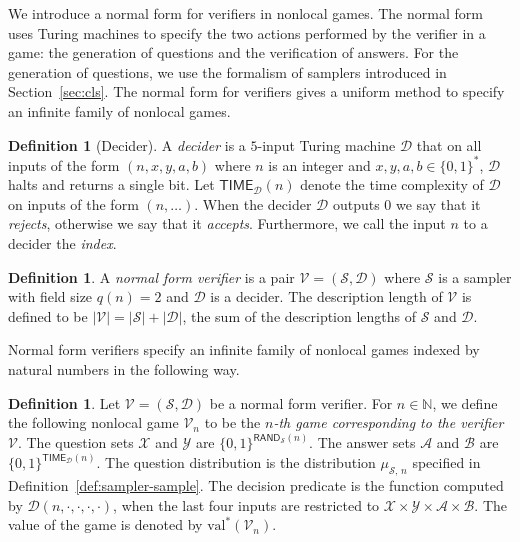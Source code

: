 \documentclass[11pt]{article}
\theoremstyle{definition}
\newtheorem{definition}[theorem]{Definition}
\newcommand{\N}{\ensuremath{\mathbb{N}}}
\newcommand{\val}{\ensuremath{\mathrm{val}}}
\newcommand{\abs}[1]{\left\vert {#1} \right\vert}
\newcommand{\sampler}{\mathcal{S}}
\newcommand{\decider}{\mathcal{D}}
\newcommand{\verifier}{\mathcal{V}}
\renewcommand{\cal}[1]{\mathcal{#1}}
\newcommand{\TIME}{\mathsf{TIME}}
\newcommand{\RAND}{\mathsf{RAND}}
\begin{document}
We introduce a normal form for verifiers in nonlocal games.
The normal form uses Turing machines to specify the two actions performed by the
verifier in a game: the generation of questions and the verification of answers.
For the generation of questions, we use the formalism of samplers introduced in
Section~\ref{sec:cls}.
The normal form for verifiers gives a uniform method to specify an infinite
family of nonlocal games.

\begin{definition}[Decider]
  \label{def:decider}
  A \emph{decider} is a $5$-input Turing machine $\decider$ that on all inputs
  of the form $(n,x,y,a,b)$ where $n$ is an integer and $x,y,a,b \in \{0,1\}^*$,
  $\decider$ halts and returns a single bit.
  Let $\TIME_\decider(n)$ denote the time complexity of $\decider$ on inputs of
  the form $(n,\ldots)$.
	When the decider $\decider$ outputs $0$ we say that it \emph{rejects},
  otherwise we say that it \emph{accepts}.
  Furthermore, we call the input $n$ to a decider the \emph{index}.
\end{definition}

\begin{definition}
  \label{def:normal-ver}
  A \emph{normal form verifier} is a pair $\verifier = (\sampler, \decider)$
  where $\sampler$ is a sampler with field size $q(n) = 2$ and $\decider$ is a
  decider.
  The description length of $\verifier$ is defined to be $\abs{\verifier} =
  \abs{\sampler} + \abs{\decider}$, the sum of the description lengths of
  $\sampler$ and $\decider$.
\end{definition}

Normal form verifiers specify an infinite family of nonlocal games indexed by
natural numbers in the following way.

\begin{definition}
  \label{def:normal-game}
  Let $\verifier = (\sampler, \decider)$ be a normal form verifier.
  For $n \in \N$, we define the following nonlocal game $\verifier_{n}$ to be
  the \emph{$n$-th game corresponding to the verifier $\verifier$}.
  The question sets $\cal{X}$ and $\cal{Y}$ are $\{0,1\}^{\RAND_\sampler(n)}$.
  The answer sets $\cal{A}$ and $\cal{B}$ are $\{0,1\}^{\TIME_\decider(n)}$.
  The question distribution is the distribution $\mu_{\sampler,\, n}$ specified
  in Definition~\ref{def:sampler-sample}.
  The decision predicate is the function computed by
  $\decider(n,\cdot,\cdot,\cdot,\cdot)$, when the last four inputs are
  restricted to $\cal{X}\times \cal{Y}\times\cal{A}\times\cal{B}$.
  The value of the game is denoted by $\val^*(\verifier_{n})$.
\end{definition}
\end{document}
